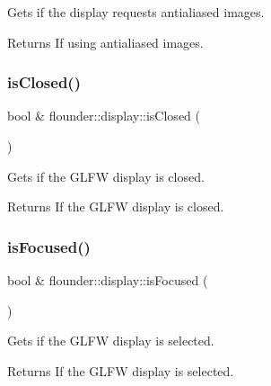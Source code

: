 Gets if the display requests antialiased images. 

\begin{DoxyReturn}{Returns}
If using antialiased images. 
\end{DoxyReturn}
\mbox{\label{classflounder_1_1display_afc0a47cb7ce2423076e4868b6b280fea}} 
\subsubsection{\texorpdfstring{is\+Closed()}{isClosed()}}
{\footnotesize\ttfamily bool \& flounder\+::display\+::is\+Closed (\begin{DoxyParamCaption}{ }\end{DoxyParamCaption})}



Gets if the G\+L\+FW display is closed. 

\begin{DoxyReturn}{Returns}
If the G\+L\+FW display is closed. 
\end{DoxyReturn}
\mbox{\label{classflounder_1_1display_a8319a69deefd25fb5b1d7dddabd35df9}} 
\subsubsection{\texorpdfstring{is\+Focused()}{isFocused()}}
{\footnotesize\ttfamily bool \& flounder\+::display\+::is\+Focused (\begin{DoxyParamCaption}{ }\end{DoxyParamCaption})}



Gets if the G\+L\+FW display is selected. 

\begin{DoxyReturn}{Returns}
If the G\+L\+FW display is selected. 
\end{DoxyReturn}
\mbox{\label{classflounder_1_1display_a70a2476a798800089f947e4ff98476ba}} 

